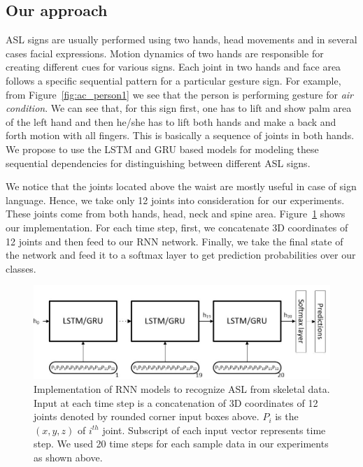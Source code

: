\documentclass[10pt,twocolumn,letterpaper]{article}
\begin{document}
\subsection{Our approach}
ASL signs are usually performed using two hands, head movements and in several  
cases facial expressions. 
Motion dynamics of 
two hands are responsible for creating different cues for various signs. Each joint in two hands and face area follows a specific sequential pattern for a particular gesture sign. For example, from Figure~\ref{fig:ac_person1} we see that 
the person is performing gesture for \textit{air condition}. We can see that, for this sign first, one has to lift and show palm area of the left hand and then he/she has to lift both hands and make a back and forth motion with all fingers. This is basically a sequence of joints in both hands. We propose to use the LSTM and GRU based models for modeling these 
sequential dependencies for distinguishing between different ASL signs. 

We notice that the joints located above the waist are mostly useful in case of sign language. Hence, we take only 12 joints into
consideration for  our experiments. These joints come from both hands, head, neck and spine area. Figure~\ref{fig:rnn_impl} shows our implementation. For each time step, first, we concatenate 3D coordinates of 12 joints and then feed to our RNN network. Finally, we take the final state of the network and feed 
it to a softmax layer to 
get prediction probabilities over our classes.

\begin{figure}[h]
	\begin{center}
		\includegraphics[width=.8\linewidth]{rnn_impl}
	\end{center}
	\caption{Implementation of RNN models to recognize ASL from skeletal data. Input at each time step is a concatenation of 3D coordinates of 12 joints denoted by rounded corner input boxes above. $P_i$ is the $(x, y, z)$ of $i^{th}$ joint. Subscript of each input vector represents time step. We used 20 time steps for each sample data in our experiments as shown above.}
	\label{fig:rnn_impl}
\end{figure}
\end{document}
